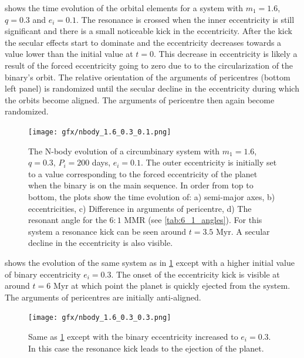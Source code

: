 \documentclass[twoside,openright,titlepage,numbers=noenddot,headinclude,%
                footinclude=true,cleardoublepage=empty,abstractoff, 
                BCOR=5mm,paper=a4,fontsize=11pt,%
                american,%
                ]{scrreprt}%
\begin{document}
 shows the time evolution of the orbital elements
for a system with $m_1=1.6$, $q=0.3$ and $e_i=0.1$. The resonance is crossed
when the inner eccentricity is still significant and there is a small 
noticeable kick in the eccentricity. After the kick the secular effects 
start to dominate and the eccentricity decreases towards a value lower
than the initial value at $t=0$. This decrease in eccentricity is likely
a result of the forced eccentricity going to zero due to to the 
circularization of the binary's orbit. The relative orientation of the
arguments of pericentres (bottom left panel) is randomized until the secular
decline in the eccentricity during which the orbits become aligned. The 
arguments of pericentre then again become randomized.
\begin{figure}[t]
\centering
    \texttt{[image: gfx/nbody\_1.6\_0.3\_0.1.png]}
\caption[N-body results example with a small eccentricity kick]
    {The  N-body evolution of a circumbinary system with $m_1=1.6$, $q=0.3$, 
    $P_i=200$ days, $e_i=0.1$. The outer eccentricity is initially set to 
    a value corresponding to the forced eccentricity of the planet when the
    binary is on the main sequence. In order from top to bottom, the 
    plots show the    time evolution of:
    a) semi-major axes, b) eccentricities, c) Difference in arguments of 
    pericentre, d) The resonant angle for the $6:1$ MMR 
    (see \cref{tab:6_1_angles}). For this system a resonance kick can
    be seen around $t=3.5$ Myr. A secular decline in the eccentricity
    is also visible.}
\label{fig:nbody_small_kick}
\end{figure}

 shows the evolution of the same system
as in \cref{fig:nbody_small_kick} except with a higher initial value
of binary eccentricity $e_i=0.3$. The onset of the eccentricity kick is
visible at around $t=6$ Myr at which point the planet is quickly ejected 
from the system. The arguments of pericentres are initially anti-aligned.
\begin{figure}[t]
\centering
    \texttt{[image: gfx/nbody\_1.6\_0.3\_0.3.png]}
    \caption[N-body results example with a large eccentricity kick]
    {Same as \cref{fig:nbody_small_kick} except with the binary
    eccentricity increased to $e_i=0.3$. In this case the resonance
    kick leads to the ejection of the planet.}
\label{fig:nbody_ejection}
\end{figure}
\end{document}
